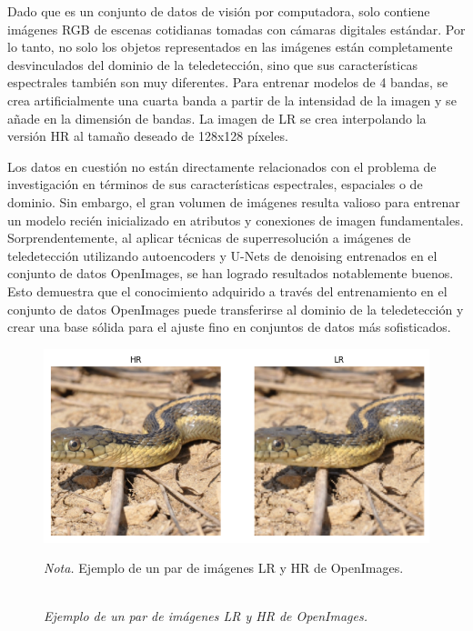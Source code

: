 Dado que es un conjunto de datos de visión por computadora, solo contiene imágenes RGB de escenas cotidianas tomadas con cámaras digitales estándar. Por lo tanto, no solo los objetos representados en las imágenes están completamente desvinculados del dominio de la teledetección, sino que sus características espectrales también son muy diferentes. Para entrenar modelos de 4 bandas, se crea artificialmente una cuarta banda a partir de la intensidad de la imagen y se añade en la dimensión de bandas. La imagen de LR se crea interpolando la versión HR al tamaño deseado de 128x128 píxeles.

Los datos en cuestión no están directamente relacionados con el problema de investigación en términos de sus características espectrales, espaciales o de dominio. Sin embargo, el gran volumen de imágenes resulta valioso para entrenar un modelo recién inicializado en atributos y conexiones de imagen fundamentales. Sorprendentemente, al aplicar técnicas de superresolución a imágenes de teledetección utilizando autoencoders y U-Nets de denoising entrenados en el conjunto de datos OpenImages, se han logrado resultados notablemente buenos. Esto demuestra que el conocimiento adquirido a través del entrenamiento en el conjunto de datos OpenImages puede transferirse al dominio de la teledetección y crear una base sólida para el ajuste fino en conjuntos de datos más sofisticados.

\begin{figure}[H] 
    \caption{\doublespacing \\ \textit{Ejemplo de un par de imágenes LR y HR de OpenImages.}} 
    \centering
    \includegraphics[width=1\linewidth]{images/openimages_example.png}
    \begin{justify}
        \textit{Nota.} Ejemplo de un par de imágenes LR y HR de OpenImages.
    \end{justify}                    
    \label{fig:openimages_example}
\end{figure}

